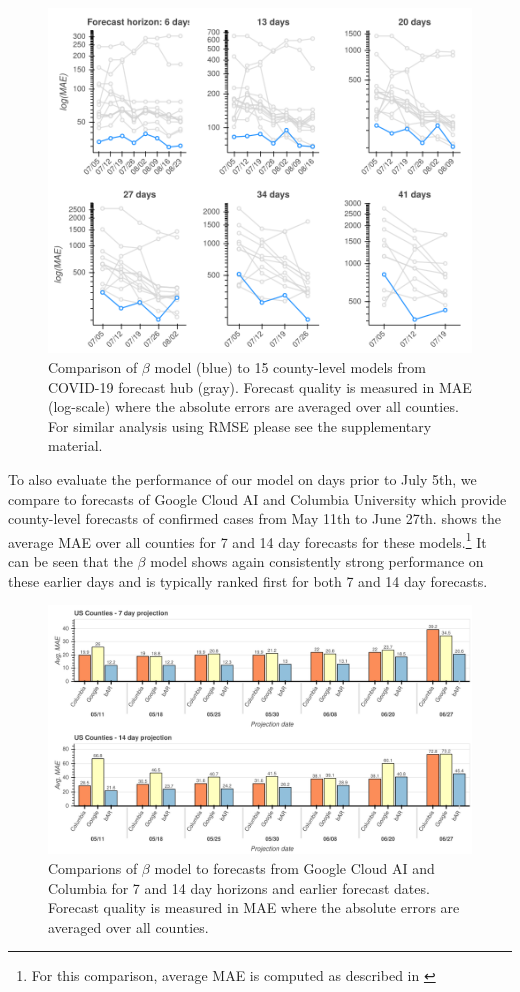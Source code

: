 \documentclass{article}
\newcommand{\bAR}{\ensuremath{\beta}\text{-AR}\xspace}
\begin{document}
\begin{figure}[t]
\centering
\includegraphics[width=.75\linewidth]{img/us_mae/us_mae.png}
\caption{\label{fig:mae-covidhub}Comparison of \bAR model (blue) to 15 county-level models from COVID-19 forecast hub (gray). Forecast quality is measured in MAE (log-scale) where the absolute errors are averaged over all counties. For similar analysis using RMSE please see the supplementary material.}
\end{figure}


To also evaluate the performance of our model on days prior to July 5th, we
compare to forecasts of Google Cloud AI \citep{arik2020interpretable} and Columbia
University \citep{forecasts/columbia} which provide county-level forecasts of
confirmed cases from May 11th to June 27th.  shows the average
MAE over all counties for 7 and 14 day forecasts for these models.\footnote{For this
comparison, average MAE is computed as described in \citep{arik2020interpretable}}
It can be seen that the \bAR model shows again consistently strong performance on these
earlier days and is typically ranked first for both 7 and 14 day forecasts.

\begin{figure}[t]
\centering
\includegraphics[width=.9\textwidth]{img/counties_bar_mae.png}
\caption{\label{fig:mae-google}Comparions of \bAR model to forecasts from Google Cloud AI and Columbia for 7 and 14 day horizons and earlier forecast dates. Forecast quality is measured in MAE where the absolute errors are averaged over all counties.}
\end{figure}
\end{document}
